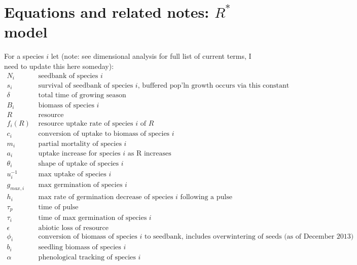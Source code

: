 \documentclass[11pt,a4paper,oneside]{article}
\begin{document}
\newpage
\section{Equations and related notes: $R^*$ model}

\noindent For a species \(i\) let (note: see dimensional analysis for full list of current terms, I need to update this here someday):
\begin{align*}
N_{i} & \text{   seedbank of species } i
\\
s_{i} & \text{   survival of seedbank of species } i \text{, buffered pop'ln
  growth occurs via this constant}
\\
\delta & \text{   total time of growing season}
\\
B_{i} &  \text{   biomass of species } i
\\
R &   \text{   resource}
\\
f_{i}(R) & \text{  resource uptake rate of species } i \text{ of } R
\\
c_{i} & \text{   conversion of uptake to biomass of species } i
\\
m_{i} & \text{   partial mortality of species } i
\\
a_{i} & \text{   uptake increase for species } i \text{ as R increases}
\\
\theta_{i} & \text{   shape of uptake of species } i
\\
u_{i}^{-1} & \text{   max uptake of species } i
\\
g_{max,i} & \text{   max germination of species } i
\\
h_{i} & \text{   max rate of germination decrease of species } i
\text{ following a pulse}
\\
\tau_{p} & \text{   time of pulse }
\\
\tau_{i} & \text{   time of max germination of species } i
\\
\epsilon & \text{   abiotic loss of resource}
\\
\phi_{i} & \text{   conversion of biomass of species } i \text{ to
  seedbank, includes overwintering of seeds (as of December 2013)}
\\
b_{i} & \text{   seedling biomass of species } i
\\
\alpha & \text{   phenological tracking of species  } i
\\
\end{align*}

\newpage 
\end{document}
